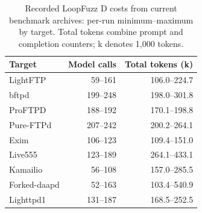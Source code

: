 \begin{table}[!tbp]
\centering\small
\caption{Recorded LoopFuzz D costs from current benchmark archives: per-run minimum--maximum by target. Total tokens combine prompt and completion counters; k denotes 1,000 tokens.}
\label{tab:observed_costs}
\begin{tabular}{lrr}
\toprule
Target & Model calls & Total tokens (k) \\
\midrule
LightFTP & 59--161 & 106.0--224.7 \\
bftpd & 199--248 & 198.0--301.8 \\
ProFTPD & 188--192 & 170.1--198.8 \\
Pure-FTPd & 207--242 & 200.2--264.1 \\
Exim & 106--123 & 109.4--151.0 \\
Live555 & 123--189 & 264.1--433.1 \\
Kamailio & 56--108 & 157.0--285.5 \\
Forked-daapd & 52--163 & 103.4--540.9 \\
Lighttpd1 & 131--187 & 168.5--252.5 \\
\bottomrule
\end{tabular}
\end{table}
